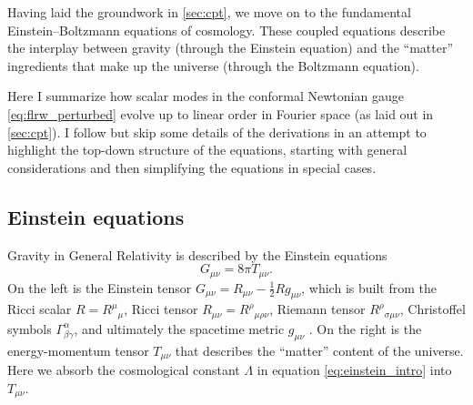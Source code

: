\documentclass[USenglish, thumbmarks]{uiophdthesis} %
\newcommand\EB{Einstein--Boltzmann}
\newcommand\GR{General Relativity}
\begin{document}
Having laid the groundwork in \cref{sec:cpt},
we move on to the fundamental \EB{} equations of cosmology.
These coupled equations describe the interplay between gravity (through the Einstein equation)
and the \enquote{matter} ingredients that make up the universe (through the Boltzmann equation).

Here I summarize how scalar modes
in the conformal Newtonian gauge \eqref{eq:flrw_perturbed}
evolve up to linear order in Fourier space (as laid out in \cref{sec:cpt}).
I follow \cite{maCosmologicalPerturbationTheory1995a} but skip some details of the derivations
in an attempt to highlight the top-down structure of the equations,
starting with general considerations and then simplifying the equations in special cases.

\subsection{Einstein equations}
\label{sec:einstein}

Gravity in \GR{} is described by the Einstein equations
\begin{equation}
G_{\mu\nu} = 8\pi T_{\mu\nu} .
\label{eq:einstein}
\end{equation}
On the left is the Einstein tensor $G_{\mu\nu} = R_{\mu\nu} - \frac12 R g_{\mu\nu}$,
which is built from the Ricci scalar $R = R^\mu{}_\mu$,
Ricci tensor $R_{\mu\nu} = R^{\rho}{}_{\mu\rho\nu}$,
Riemann tensor $R^{\rho}{}_{\sigma\mu\nu}$,
Christoffel symbols $\Gamma^{\alpha}_{\beta\gamma}$,
and ultimately the spacetime metric $g_{\mu\nu}$ \cite[e.g.][]{dodelsonModernCosmology2021a}.
On the right is the energy-momentum tensor $T_{\mu\nu}$ that describes the \enquote{matter} content of the universe.
Here we absorb the cosmological constant $\Lambda$ in equation \eqref{eq:einstein_intro} into $T_{\mu\nu}$.
\end{document}
